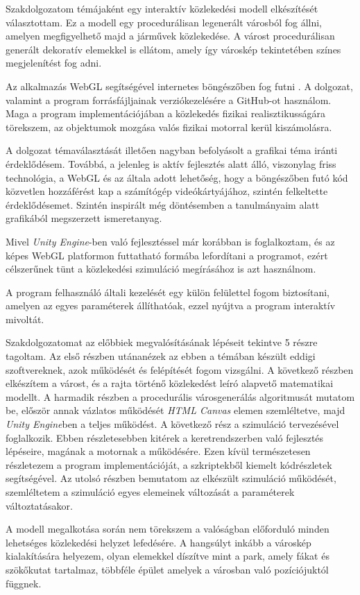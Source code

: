 
Szakdolgozatom témájaként egy interaktív közlekedési modell elkészítését választottam. Ez a modell egy procedurálisan legenerált városból fog állni, amelyen megfigyelhető majd a járművek közlekedése. A várost procedurálisan generált dekoratív elemekkel is ellátom, amely így városkép tekintetében színes megjelenítést fog adni. 

Az alkalmazás WebGL segítségével internetes böngészőben fog futni \cite{webgl}.
A dolgozat, valamint a program forrásfájljainak verziókezelésére a GitHub-ot használom.
Maga a program implementációjában a közlekedés fizikai realisztikusságára törekszem, az objektumok mozgása valós fizikai motorral kerül kiszámolásra.

A dolgozat témaválasztását illetően nagyban befolyásolt a grafikai téma iránti érdeklődésem. Továbbá, a jelenleg is aktív fejlesztés alatt álló, viszonylag friss technológia, a WebGL és az általa adott lehetőség, hogy a böngészőben futó kód közvetlen hozzáférést kap a számítógép videókártyájához, szintén felkeltette érdeklődésemet. Szintén inspirált még döntésemben a tanulmányaim alatt grafikából megszerzett ismeretanyag.

Mivel \textit{Unity Engine}-ben való fejlesztéssel már korábban is foglalkoztam, és az képes WebGL platformon futtatható formába lefordítani a programot, ezért célszerűnek tünt a közlekedési szimuláció megírásához is azt használnom.

A program felhasználó általi kezelését egy külön felülettel fogom biztosítani, amelyen az egyes paraméterek állíthatóak, ezzel nyújtva a program interaktív mivoltát.

Szakdolgozatomat az előbbiek megvalósításának lépéseit tekintve 5 részre tagoltam. Az első részben utánanézek az ebben a témában készült eddigi szoftvereknek, azok működését és felépítését fogom vizsgálni. 
A következő részben elkészítem a várost, és a rajta történő közlekedést leíró alapvető matematikai modellt. 
A harmadik részben a procedurális városgenerálás algoritmusát mutatom be, először annak vázlatos működését \textit{HTML Canvas} elemen szemléltetve, majd \textit{Unity Engine}ben a teljes működést. 
A következő rész a szimuláció tervezésével foglalkozik. Ebben részletesebben kitérek a keretrendszerben való fejlesztés lépéseire, magának a motornak a működésére. Ezen kívül természetesen részletezem a program implementációját, a szkriptekből kiemelt kódrészletek segítségével.
Az utolsó részben bemutatom az elkészült szimuláció működését, szemléltetem a szimuláció egyes elemeinek változását a paraméterek változtatásakor.

A modell megalkotása során nem törekszem a valóságban előforduló minden lehetséges közlekedési helyzet lefedésére. A hangsúlyt inkább a városkép kialakítására helyezem, olyan elemekkel díszítve mint a park, amely fákat és szökőkutat tartalmaz, többféle épület amelyek a városban való pozíciójuktól függnek.